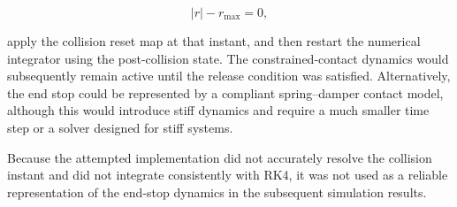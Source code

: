 \begin{equation}
|r|-r_{\max}=0,
\end{equation}

apply the collision reset map at that instant, and then restart the numerical integrator using the post-collision state. The constrained-contact dynamics would subsequently remain active until the release condition was satisfied. Alternatively, the end stop could be represented by a compliant spring--damper contact model, although this would introduce stiff dynamics and require a much smaller time step or a solver designed for stiff systems.

Because the attempted implementation did not accurately resolve the collision instant and did not integrate consistently with RK4, it was not used as a reliable representation of the end-stop dynamics in the subsequent simulation results.